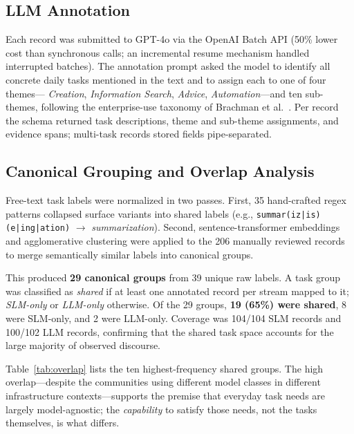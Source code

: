 \subsection{LLM Annotation}

Each record was submitted to GPT-4o via the OpenAI Batch API (50\% lower cost
than synchronous calls; an incremental resume mechanism handled interrupted
batches).
The annotation prompt asked the model to identify all concrete daily tasks
mentioned in the text and to assign each to one of four themes---
\textit{Creation}, \textit{Information Search}, \textit{Advice},
\textit{Automation}---and ten sub-themes, following the enterprise-use taxonomy
of Brachman et al.~\cite{brachman2024enterprise}.
Per record the schema returned task descriptions, theme and sub-theme
assignments, and evidence spans; multi-task records stored fields
pipe-separated.

\subsection{Canonical Grouping and Overlap Analysis}

Free-text task labels were normalized in two passes.
First, 35 hand-crafted regex patterns collapsed surface variants into shared
labels (e.g., \texttt{summar(iz|is)(e|ing|ation)} $\to$
\textit{summarization}).
Second, sentence-transformer embeddings and agglomerative clustering were
applied to the 206 manually reviewed records to merge semantically similar
labels into canonical groups.

This produced \textbf{29 canonical groups} from 39 unique raw labels.
A task group was classified as \textit{shared} if at least one annotated
record per stream mapped to it; \textit{SLM-only} or \textit{LLM-only}
otherwise.
Of the 29 groups, \textbf{19 (65\%) were shared}, 8 were SLM-only, and 2
were LLM-only.
Coverage was 104/104 SLM records and 100/102 LLM records, confirming that
the shared task space accounts for the large majority of observed discourse.

Table~\ref{tab:overlap} lists the ten highest-frequency shared groups.
The high overlap---despite the communities using different model classes in
different infrastructure contexts---supports the premise that everyday task
needs are largely model-agnostic; the \textit{capability} to satisfy those
needs, not the tasks themselves, is what differs.

